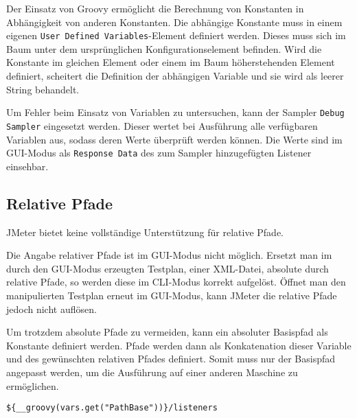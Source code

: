 Der Einsatz von Groovy ermöglicht die Berechnung von Konstanten in Abhängigkeit von anderen Konstanten.
Die abhängige Konstante muss in einem eigenen \texttt{User Defined Variables}-Element definiert werden.
Dieses muss sich im Baum unter dem ursprünglichen Konfigurationselement befinden.
Wird die Konstante im gleichen Element oder einem im Baum höherstehenden Element definiert,
scheitert die Definition der abhängigen Variable und sie wird als leerer String behandelt.

Um Fehler beim Einsatz von Variablen zu untersuchen,
kann der Sampler \texttt{Debug Sampler} eingesetzt werden.
Dieser wertet bei Ausführung alle verfügbaren Variablen aus, sodass deren Werte überprüft werden können.
Die Werte sind im GUI-Modus als \texttt{Response Data} des zum Sampler hinzugefügten Listener einsehbar.

\subsection{Relative Pfade}

JMeter bietet keine vollständige Unterstützung für relative Pfade.

Die Angabe relativer Pfade ist im GUI-Modus nicht möglich.
Ersetzt man im durch den GUI-Modus erzeugten Testplan, einer XML-Datei, absolute durch relative Pfade,
so werden diese im CLI-Modus korrekt aufgelöst.
Öffnet man den manipulierten Testplan erneut im GUI-Modus,
kann JMeter die relative Pfade jedoch nicht auflösen.

Um trotzdem absolute Pfade zu vermeiden,
kann ein absoluter Basispfad als Konstante definiert werden.
Pfade werden dann als Konkatenation dieser Variable und des gewünschten relativen Pfades definiert.
Somit muss nur der Basispfad angepasst werden, um die Ausführung auf einer anderen Maschine zu ermöglichen.

\begin{lstlisting}[caption=Workaround zur Angabe relativer Pfade]
    ${__groovy(vars.get("PathBase"))}/listeners
\end{lstlisting}
